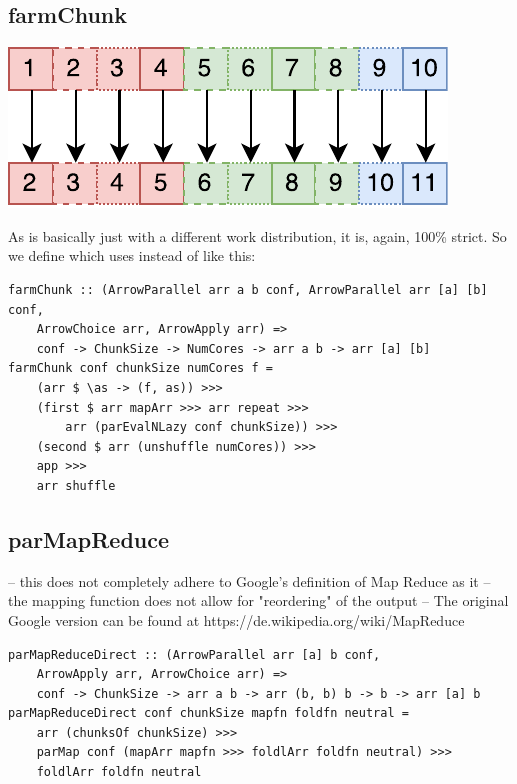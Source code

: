 \subsection{farmChunk}
\begin{center}
	\includegraphics[scale=0.7]{images/farmChunk}
\end{center}
As  is basically just  with a different work distribution, it is, again, 100\% strict. So we define  which uses  instead of  like this:
\begin{lstlisting}[frame=htrbl]
farmChunk :: (ArrowParallel arr a b conf, ArrowParallel arr [a] [b] conf,
	ArrowChoice arr, ArrowApply arr) =>
	conf -> ChunkSize -> NumCores -> arr a b -> arr [a] [b]
farmChunk conf chunkSize numCores f =
	(arr $ \as -> (f, as)) >>>
	(first $ arr mapArr >>> arr repeat >>>
		arr (parEvalNLazy conf chunkSize)) >>>
	(second $ arr (unshuffle numCores)) >>>
	app >>>
	arr shuffle
\end{lstlisting}

\subsection{parMapReduce}
-- this does not completely adhere to Google's definition of Map Reduce as it
-- the mapping function does not allow for "reordering" of the output
-- The original Google version can be found at https://de.wikipedia.org/wiki/MapReduce

\begin{lstlisting}[frame=htrbl]
parMapReduceDirect :: (ArrowParallel arr [a] b conf,
	ArrowApply arr, ArrowChoice arr) =>
	conf -> ChunkSize -> arr a b -> arr (b, b) b -> b -> arr [a] b
parMapReduceDirect conf chunkSize mapfn foldfn neutral =
	arr (chunksOf chunkSize) >>>
	parMap conf (mapArr mapfn >>> foldlArr foldfn neutral) >>>
	foldlArr foldfn neutral
\end{lstlisting}